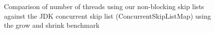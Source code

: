 \begin{figure}\label{fig:growShrink}
	\begin{center}
	\end{center}
	\caption{Comparison of number of threads using our non-blocking skip lists against the JDK concurrent skip list (ConcurrentSkipListMap) using the grow and shrink benchmark}
\end{figure}


